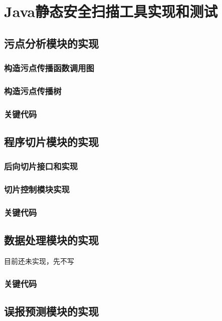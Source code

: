 \chapter{Java静态安全扫描工具实现和测试}
\section{污点分析模块的实现}
\subsection{构造污点传播函数调用图}
\subsection{构造污点传播树}
\subsection{关键代码}

\section{程序切片模块的实现}

\subsection{后向切片接口和实现}

\subsection{切片控制模块实现}

\subsection{关键代码}

\section{数据处理模块的实现}
目前还未实现，先不写\\
\subsection{关键代码}

\section{误报预测模块的实现}

